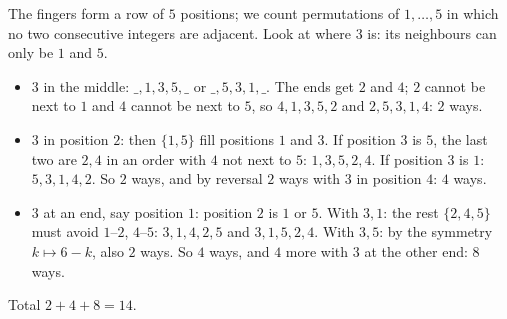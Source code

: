 The fingers form a row of $5$ positions; we count permutations of $1,\dots,5$ in which no two consecutive integers are adjacent. Look at where $3$ is: its neighbours can only be $1$ and $5$.
\begin{itemize}
\item $3$ in the middle: $\_,1,3,5,\_$ or $\_,5,3,1,\_$. The ends get $2$ and $4$; $2$ cannot be next to $1$ and $4$ cannot be next to $5$, so $4,1,3,5,2$ and $2,5,3,1,4$: $2$ ways.
\item $3$ in position $2$: then $\{1,5\}$ fill positions $1$ and $3$. If position $3$ is $5$, the last two are $2,4$ in an order with $4$ not next to $5$: $1,3,5,2,4$. If position $3$ is $1$: $5,3,1,4,2$. So $2$ ways, and by reversal $2$ ways with $3$ in position $4$: $4$ ways.
\item $3$ at an end, say position $1$: position $2$ is $1$ or $5$. With $3,1$: the rest $\{2,4,5\}$ must avoid $1$--$2$, $4$--$5$: $3,1,4,2,5$ and $3,1,5,2,4$. With $3,5$: by the symmetry $k\mapsto6-k$, also $2$ ways. So $4$ ways, and $4$ more with $3$ at the other end: $8$ ways.
\end{itemize}
Total $2+4+8=\boxed{14}$.
